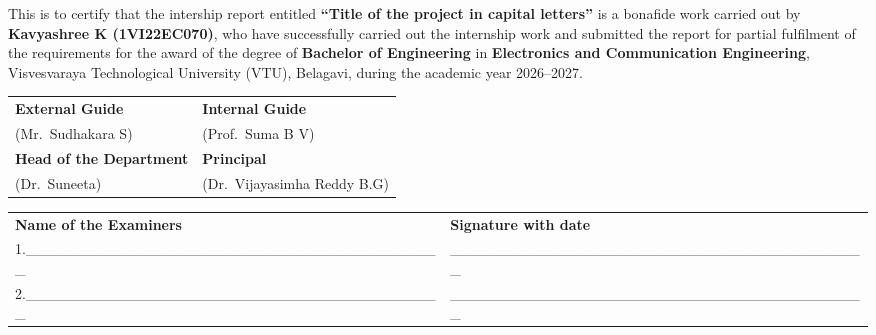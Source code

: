 \documentclass[12pt,a4paper,twocolumn,fleqn]{article}
\begin{document}
\noindent
This is to certify that the intership report entitled \textbf{“Title of the project in capital letters”} is a bonafide work carried out by  
\textbf{Kavyashree K (1VI22EC070)},
who have successfully carried out the internship work and submitted the report for partial fulfilment of the requirements for the award of the degree of 
\textbf{Bachelor of Engineering} in  
\textbf{Electronics and Communication Engineering},  
Visvesvaraya Technological University (VTU), Belagavi, during the academic year 2026–2027. \\[0.1cm] 
\newline
\begin{center}
\renewcommand{\arraystretch}{1.5} %

\begin{tabular}{p{7cm} p{7cm}}

\hspace{1.8cm}\textbf{External Guide} & \hspace{1.8cm}\textbf{Internal Guide} \\
\hspace{1.8cm}(Mr.\ Sudhakara S) & \hspace{1.8cm}(Prof.\ Suma B V) \\[1cm]

\hspace{1.3cm}\textbf{Head of the Department} & \hspace{2.2cm}\textbf{Principal} \\
\hspace{2.6cm}(Dr.\ Suneeta) & \hspace{0.8cm}(Dr.\ Vijayasimha Reddy B.G) \\

\end{tabular}
\end{center}
\begin{tabular}{p{8.7cm} p{7cm}}\\[7mm]
\textbf{Name of the Examiners} & \hspace{0.5cm}\textbf{Signature with date}
\\[6mm]
\hspace{-0.7cm}1.\_\_\_\_\_\_\_\_\_\_\_\_\_\_\_\_\_\_\_\_\_\_\_\_\_\_\_\_\_\_\_\_\_\_\_\_\_\_\_\_ & \_\_\_\_\_\_\_\_\_\_\_\_\_\_\_\_\_\_\_\_\_\_\_\_\_\_\_\_\_\_\_\_\_\_\_\_\_\_\_\_\\[10mm]
\hspace{-0.7cm}2.\_\_\_\_\_\_\_\_\_\_\_\_\_\_\_\_\_\_\_\_\_\_\_\_\_\_\_\_\_\_\_\_\_\_\_\_\_\_\_\_ & \_\_\_\_\_\_\_\_\_\_\_\_\_\_\_\_\_\_\_\_\_\_\_\_\_\_\_\_\_\_\_\_\_\_\_\_\_\_\_\_\\[6mm]
\end{tabular}
\end{document}
